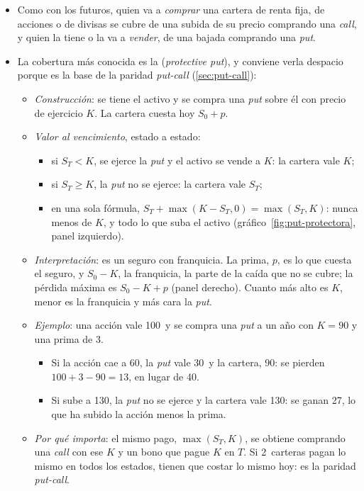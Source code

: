 \documentclass[11pt]{article}
\begin{document}
\begin{itemize}
\item Como con los futuros, quien va a \emph{comprar} una cartera de renta fija, de acciones o de divisas se cubre de una subida de su precio comprando una \emph{call}, y quien la tiene o la va a \emph{vender}, de una bajada comprando una \emph{put}.
\item La cobertura más conocida es la  (\emph{protective put}), y conviene verla despacio porque es la base de la paridad \emph{put-call} (\ref{sec:put-call}):
  \begin{itemize}
  \item \emph{Construcción}: se tiene el activo y se compra una \emph{put} sobre él con precio de ejercicio $K$. La cartera cuesta hoy $S_0+p$.
  \item \emph{Valor al vencimiento}, estado a estado:
    \begin{itemize}
    \item si $S_T<K$, se ejerce la \emph{put} y el activo se vende a $K$: la cartera vale $K$;
    \item si $S_T\geq K$, la \emph{put} no se ejerce: la cartera vale $S_T$;
    \item en una sola fórmula, $S_T+\max(K-S_T,0)=\max(S_T,K)$: nunca menos de $K$, y todo lo que suba el activo (gráfico~\ref{fig:put-protectora}, panel izquierdo).
    \end{itemize}
  \item \emph{Interpretación}: es un seguro con franquicia. La prima, $p$, es lo que cuesta el seguro, y $S_0-K$, la franquicia, la parte de la caída que no se cubre; la pérdida máxima es $S_0-K+p$ (panel derecho). Cuanto más alto es $K$, menor es la franquicia y más cara la \emph{put}.
  \item \emph{Ejemplo}: una acción vale 100~y se compra una \emph{put} a un año con $K=90$ y una prima de 3.
    \begin{itemize}
    \item Si la acción cae a 60, la \emph{put} vale 30~y la cartera, 90: se pierden $100+3-90=13$, en lugar de 40.
    \item Si sube a 130, la \emph{put} no se ejerce y la cartera vale 130: se ganan 27, lo que ha subido la acción menos la prima.
    \end{itemize}
  \item \emph{Por qué importa}: el mismo pago, $\max(S_T,K)$, se obtiene comprando una \emph{call} con ese $K$ y un bono que pague $K$ en $T$. Si 2~carteras pagan lo mismo en todos los estados, tienen que costar lo mismo hoy: es la paridad \emph{put-call}.

\end{itemize}
\end{itemize}
\end{document}
